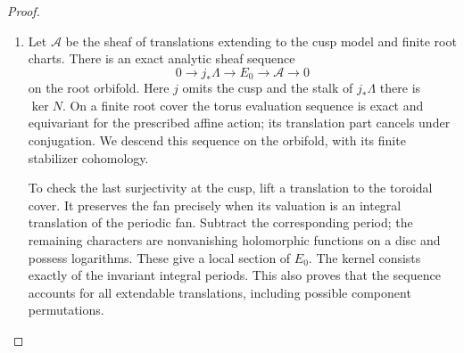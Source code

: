 \begin{proof}
\begin{enumerate}[label={$\langle1\rangle$\arabic*.}]
\item Let $\mathcal A$ be the sheaf of translations extending to
the cusp model and finite root charts. There is
an exact analytic sheaf sequence
\[
0\to j_*\Lambda\to E_0\to\mathcal A\to0
\]
on the root orbifold. Here $j$ omits the cusp and the stalk
of $j_*\Lambda$ there is $\ker N$.
On a finite root cover the torus evaluation sequence is exact and
equivariant for the prescribed affine action; its translation part
cancels under conjugation.  We descend this sequence on the orbifold, with its finite stabilizer cohomology.

To check the last surjectivity at the cusp, lift a translation
to the toroidal cover. It preserves the fan precisely when
its valuation is an integral translation of the periodic
fan. Subtract the corresponding period; the remaining
characters are nonvanishing holomorphic functions on a
disc and possess logarithms. These give a local section
of $E_0$. The kernel consists exactly of the invariant
integral periods. This also proves that the sequence
accounts for all extendable translations, including
possible component permutations.


\end{enumerate}
\end{proof}
